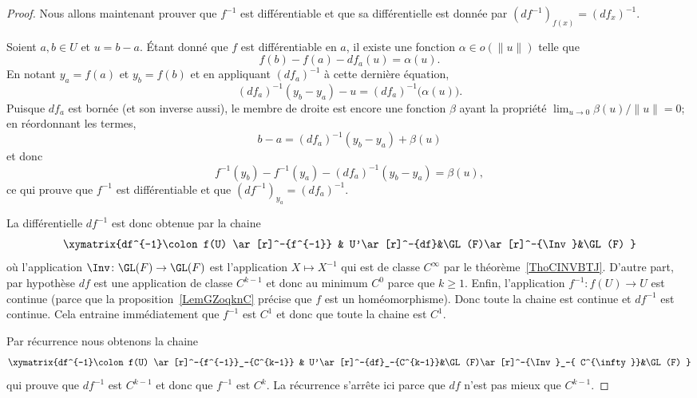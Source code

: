 \begin{proof}
	Nous allons maintenant prouver que \( f^{-1}\) est différentiable et que sa différentielle est donnée par \( (df^{-1})_{f(x)}=(df_x)^{-1}\).

	Soient \( a,b\in U\) et \( u=b-a\). Étant donné que \( f\) est différentiable en \( a\), il existe une fonction \( \alpha\in o(\| u \|)\) telle que
	\begin{equation}
		f(b)-f(a)-df_a(u)=\alpha(u).
	\end{equation}
	En notant \( y_a=f(a)\) et \( y_b=f(b)\) et en appliquant \( (df_a)^{-1}\) à cette dernière équation,
	\begin{equation}
		(df_a)^{-1}(y_b-y_a)-u=(df_a)^{-1} \big( \alpha(u) \big).
	\end{equation}
	Puisque \( df_a\) est bornée (et son inverse aussi), le membre de droite est encore une fonction \( \beta\) ayant la propriété \( \lim_{u\to 0}\beta(u)/\| u \|=0\); en réordonnant les termes,
	\begin{equation}
		b-a=(df_a)^{-1}(y_b-y_a)+\beta(u)
	\end{equation}
	et donc
	\begin{equation}
		f^{-1}(y_b)-f^{-1}(y_a)-(df_a)^{-1}(y_b-y_a)=\beta(u),
	\end{equation}
	ce qui prouve que \( f^{-1}\) est différentiable et que \( (df^{-1})_{y_a}=(df_a)^{-1}\).

	La différentielle \( df^{-1}\) est donc obtenue par la chaine
	\begin{equation}
		\xymatrix{%
		df^{-1}\colon f(U) \ar[r]^-{f^{-1}}     &   U'\ar[r]^-{df}&\GL(F)\ar[r]^-{\Inv}&\GL(F)
		}
	\end{equation}
	où l'application \( \Inv\colon \GL(F)\to \GL(F)\) est l'application \( X\mapsto X^{-1}\) qui est de classe \(  C^{\infty}\) par le théorème~\ref{ThoCINVBTJ}. D'autre part, par hypothèse \( df\) est une application de classe \( C^{k-1}\) et donc au minimum \( C^0\) parce que \( k\geq 1\). Enfin, l'application \( f^{-1}\colon f(U)\to U\) est continue (parce que la proposition~\ref{LemGZoqknC} précise que \( f\) est un homéomorphisme). Donc toute la chaine est continue et \( df^{-1}\) est continue. Cela entraine immédiatement que \( f^{-1}\) est \( C^1\) et donc que toute la chaine est \( C^1\).

	Par récurrence nous obtenons la chaine
	\begin{equation}
		\xymatrix{%
		df^{-1}\colon f(U) \ar[r]^-{f^{-1}}_-{C^{k-1}}     &   U'\ar[r]^-{df}_-{C^{k-1}}&\GL(F)\ar[r]^-{\Inv}_-{ C^{\infty}}&\GL(F)
		}
	\end{equation}
	qui prouve que \( df^{-1}\) est \( C^{k-1} \) et donc que \( f^{-1}\) est \( C^k\). La récurrence s'arrête ici parce que \( df\) n'est pas mieux que \( C^{k-1}\).
\end{proof}

